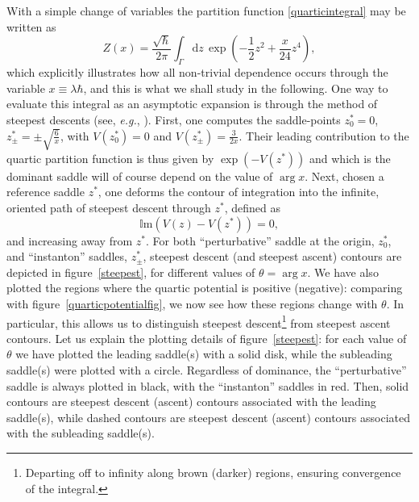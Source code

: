 \documentclass[11pt,a4paper]{article}
\newcommand{\be}{\begin{equation}}
\newcommand{\ee}{\end{equation}}
\def\im{{\mathbb{I}}{\mathrm{m}}}
\newcommand{\rmd}{{\mathrm{d}}}
\begin{document}
With a simple change of variables the partition function \eqref{quarticintegral} may be written as
%
\be
\label{quarticintegralX}
Z (x) = \frac{\sqrt{\hbar}}{2\pi} \int_{\Gamma} \rmd z\, \exp \left( - \frac{1}{2} z^2 + \frac{x}{24} z^4 \right),
\ee
%
\noindent
which explicitly illustrates how all non-trivial dependence occurs through the variable $x \equiv \lambda \hbar$, and this is what we shall study in the following. One way to evaluate this integral as an asymptotic expansion is through the method of steepest descents (see, \textit{e.g.}, \cite{bo78}). First, one computes the saddle-points $z^*_0 = 0$, $z^*_{\pm} = \pm \sqrt{\frac{6}{x}}$, with $V(z^*_0) = 0$ and $V(z^*_{\pm}) = \frac{3}{2x}$. Their leading contribution to the quartic partition function is thus given by $\exp \left( - V(z^*) \right)$ and which is the dominant saddle will of course depend on the value of $\arg x$. Next, chosen a reference saddle $z^*$, one deforms the contour of integration into the infinite, oriented path of steepest descent through $z^*$, defined as
%
\be
\label{steepestdescentcontour-def}
\im \left( V(z) - V(z^*) \right) = 0,
\ee
%
\noindent
and increasing away from $z^*$. For both ``perturbative'' saddle at the origin, $z^*_0$, and ``instanton'' saddles, $z^*_{\pm}$, steepest descent (and steepest ascent) contours are depicted in figure~\ref{steepest}, for different values of $\theta = \arg x$. We have also plotted the regions where the quartic potential is positive (negative): comparing with figure~\ref{quarticpotentialfig}, we now see how these regions change with $\theta$. In particular, this allows us to distinguish steepest descent\footnote{Departing off to infinity along brown (darker) regions, ensuring convergence of the integral.} from steepest ascent contours. Let us explain the plotting details of figure~\ref{steepest}: for each value of $\theta$ we have plotted the leading saddle(s) with a solid disk, while the subleading saddle(s) were plotted with a circle. Regardless of dominance, the ``perturbative'' saddle is always plotted in black, with the ``instanton'' saddles in red. Then, solid contours are steepest descent (ascent) contours associated with the leading saddle(s), while dashed contours are steepest descent (ascent) contours associated with the subleading saddle(s).
\end{document}
